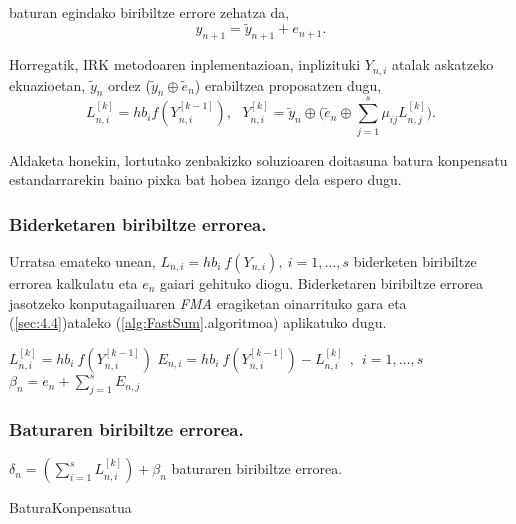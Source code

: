 \paragraph*{}baturan egindako  biribiltze errore zehatza da,
\begin{equation}
y_{n+1}=\tilde {y}_{n+1}+e_{n+1}. 
\end{equation}

Horregatik, IRK metodoaren inplementazioan, inplizituki $Y_{n,i}$ atalak askatzeko ekuazioetan, $\tilde {y}_n$ ordez ($\tilde{y}_n \oplus \tilde{e}_{n}$) erabiltzea proposatzen dugu, 
\begin{equation}
\label{eq:eqbk}
L_{n,i}^{[k]}=hb_if(Y_{n,i}^{[k-1]}), \ \ \ Y_{n,i}^{[k]}=\tilde{y}_n \oplus \big(\tilde{e}_{n} \oplus \sum\limits_{j=1}^{s} \mu_{ij} L_{n,j}^{[k]}\big).
\end{equation}

Aldaketa honekin, lortutako zenbakizko soluzioaren doitasuna batura konpensatu estandarrarekin baino pixka bat hobea izango dela espero dugu. 

\subsubsection*{Biderketaren biribiltze errorea.}

Urratsa emateko unean, $L_{n,i}=hb_i \ f(Y_{n,i}), \ i=1,\dots,s$ biderketen biribiltze errorea kalkulatu eta $e_{n}$ gaiari gehituko diogu. Biderketaren biribiltze errorea jasotzeko konputagailuaren \emph{FMA} eragiketan oinarrituko gara eta (\ref{sec:4.4})ataleko (\ref{alg:FastSum}.algoritmoa) aplikatuko dugu. 

\begin{algorithm}[h]
$L_{n,i}^{[k]}=hb_i \ f(Y_{n,i}^{[k-1]})$\; 
$E_{n,i}=hb_i \ f(Y^{[k-1]}_{n,i}) - L^{[k]}_{n,i} \ \ , \ \ i=1,\dots,s$\;
$\beta_{n}={e}_{n} + \sum\limits_{j=1}^{s}E_{n,j}$\;
\end{algorithm}

\subsubsection*{Baturaren biribiltze errorea.}

$\delta_n=\left(\sum\limits_{i=1}^{s}L_{n,i}^{[k]}\right)+\beta_{n}$ baturaren biribiltze errorea.


\begin{algorithm}[H]
  \SetAlgoLined\DontPrintSemicolon
  \caption{BaturaKonpensatua}
\end{algorithm} 

